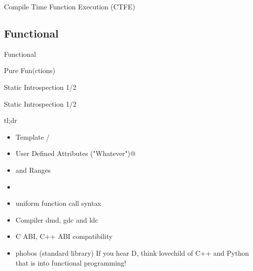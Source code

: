 \documentclass[xelatex,10pt]{beamer}
\begin{document}
\begin{frame}{Compile Time Function Execution (CTFE)}

\end{frame}

\subsection{Functional}
\begin{frame}{Functional}

\end{frame}

\begin{frame}{Pure Fun(ctions)}

\end{frame}

\begin{frame}{Static Introspection 1/2}



\end{frame}

\begin{frame}{Static Introspection 1/2}

\end{frame}

\begin{frame}{tl;dr}
\begin{itemize}
	\item Template \lstinline@struct@es/\lstinline@class@es
	\item User Defined Attributes \lstinline@\@Bar("Whatever")@
	\item \lstinline@foreach@ and Ranges
	\item \lstinline@module@s
	\item uniform function call syntax
	\item Compiler dmd, gdc and ldc
	\item C ABI, C++ ABI compatibility
	\item phobos (standard library)
	\pause
	\vfill
	If you hear D, think lovechild of C++ and Python that is into functional
programming!
\end{itemize}
\end{frame}
\end{document}
